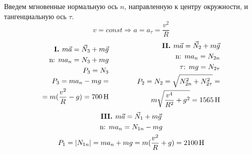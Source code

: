 \documentclass[a5paper,10pt]{article}
\begin{document}
\begin{figure}[H]
\end{figure}
Введем мгновенные нормальную ось $n$, направленную к центру окружности, и тангенциальную ось $\tau$.
\begin{equation*}
	v=const \Longrightarrow a=a_\tau=\frac{v^2}{R}
\end{equation*}
\begin{equation*}
	\begin{aligned}[c]
		\textbf{I.  }
		m\vec{a}=\vec{N}_3+m\vec{g}\\
		\text{n: }ma_n=N_3+mg\\
		P_3=N_3\\
		P_3=ma_n-mg=\\
		=m(\frac{v^2}{R}-g)=700\text{\,H}
	\end{aligned}
		\qquad\qquad
	\begin{aligned}[c]
	\textbf{II.  }
	m\vec{a}=\vec{N}_2+m\vec{g}\\
	\text{n: }ma_n=N_{2n}\\
	\text{$\tau$: }mg=N_{2\tau}\\
	P_2=N_2=\sqrt{N_{2n}^2+N_{2\tau}^2}=\\
	m\sqrt{\frac{v^4}{R^2}+g^2}=1565\text{\,H}
	\end{aligned}
\end{equation*}
\begin{gather*}
	\textbf{III.  }
	m\vec{a}=\vec{N}_1+m\vec{g}\\
	\text{n: }ma_n=N_{1n}-mg\\
	P_1=|N_{1n}|=ma_n+mg=m(\frac{v^2}{R}+g)=2100\text{\,H}
\end{gather*}
\end{document}
